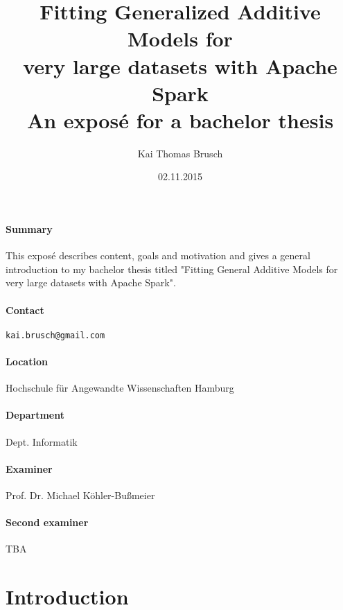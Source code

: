 \documentclass{article}
\title{
    Fitting Generalized Additive Models for\\ very large datasets with Apache Spark \\[7pt]
    \large An exposé for a bachelor thesis
}
\date{02.11.2015}
\author{Kai Thomas Brusch}
\begin{document}

    \maketitle

    \paragraph{Summary}

    This exposé describes content, goals and motivation and gives a general introduction to my bachelor thesis titled "Fitting General Additive Models for very large datasets with Apache Spark".

    \paragraph{Contact} \texttt{kai.brusch@gmail.com}

    \paragraph{Location} Hochschule für Angewandte Wissenschaften Hamburg
    \paragraph{Department} Dept. Informatik
    \paragraph{Examiner} Prof. Dr. Michael Köhler-Bußmeier
    \paragraph{Second examiner} TBA

    \newpage

    \tableofcontents

    \newpage

    \section{Introduction}
\end{document}
